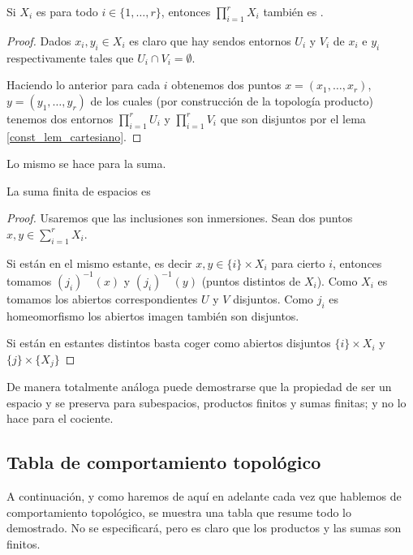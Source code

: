 \begin{lem}[Productos]
	Si $X_i$ es \hausdorff para todo $i\in\{1,\dots,r\}$, entonces $\prod_{i=1}^rX_i$ también es \hausdorff.
\end{lem}
\begin{proof}
	Dados $x_i,y_i\in X_i$ es claro que hay sendos entornos $U_i$ y $V_i$ de $x_i$ e $y_i$ respectivamente tales que $U_i\cap V_i=\emptyset$.
	
	Haciendo lo anterior para cada $i$ obtenemos dos puntos $x=(x_1,\dots,x_r)$, $y=(y_1,\dots,y_r)$ de los cuales (por construcción de la topología producto) tenemos dos entornos $\prod_{i=1}^rU_i$ y $\prod_{i=1}^rV_i$ que son disjuntos por el lema \ref{const_lem_cartesiano}.
\end{proof}
Lo mismo se hace para la suma.
\begin{lem}[Suma]
	La suma finita de espacios \hausdorff es \hausdorff
\end{lem}
\begin{proof}
	Usaremos que las inclusiones son inmersiones. Sean dos puntos $x,y\in\sum_{i=1}^rX_i$.
	
	Si están en el mismo estante, es decir $x,y\in \{i\}\times X_i$ para cierto $i$, entonces tomamos $(j_i)^{-1}(x)$ y $(j_i)^{-1}(y)$ (puntos distintos de $X_i$). Como $X_i$ es \hausdorff tomamos los abiertos correspondientes $U$ y $V$ disjuntos. Como $j_i$ es homeomorfismo los abiertos imagen también son disjuntos.
	
	Si están en estantes distintos basta coger como abiertos disjuntos $\{i\}\times X_i$ y $\{j\}\times\{X_j\}$
\end{proof}
De manera totalmente análoga puede demostrarse que la propiedad de ser un espacio \kolmogorov y \frechet se preserva para subespacios, productos finitos y sumas finitas; y no lo hace para el cociente.
\subsection{Tabla de comportamiento topológico}
A continuación, y como haremos de aquí en adelante cada vez que hablemos de comportamiento topológico, se muestra una tabla que resume todo lo demostrado. No se especificará, pero es claro que los productos y las sumas son finitos.


